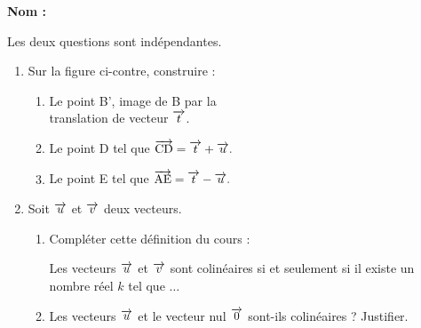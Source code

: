 \documentclass[a4paper,11pt,DIV15,BCOR0mm]{scrartcl}
\begin{document}
\vfill
\textbf{Nom :}
\vfill

\begin{exercice}[Cours]
Les deux  questions sont indépendantes.
\begin{enumerate}
 \item Sur la figure ci-contre, construire :
\begin{enumerate}
 \item Le point B', image de B par la \\translation de vecteur $\overrightarrow{t}$.
 \item Le point D tel que $\overrightarrow{\text{CD}}=\overrightarrow{t}+\overrightarrow{u}.$
 \item Le point E tel que $\overrightarrow{\text{AE}}=\overrightarrow{t}-\overrightarrow{u}.$
\end{enumerate}
\vspace{1cm}
  \item Soit $\overrightarrow{u}$ et $\overrightarrow{v}$ deux vecteurs.
  \begin{enumerate}
    \item Compléter cette définition du cours :

Les vecteurs $\overrightarrow{u}$ et $\overrightarrow{v}$ sont colinéaires si et seulement si il existe un nombre réel $k$ tel que $\dots$
\vfill
	\item Les vecteurs $\overrightarrow{u}$ et le vecteur nul $\overrightarrow{0}$ sont-ils colinéaires ?
	Justifier.
	\vfill
  \end{enumerate}

\end{enumerate}
\end{exercice}
\end{document}
